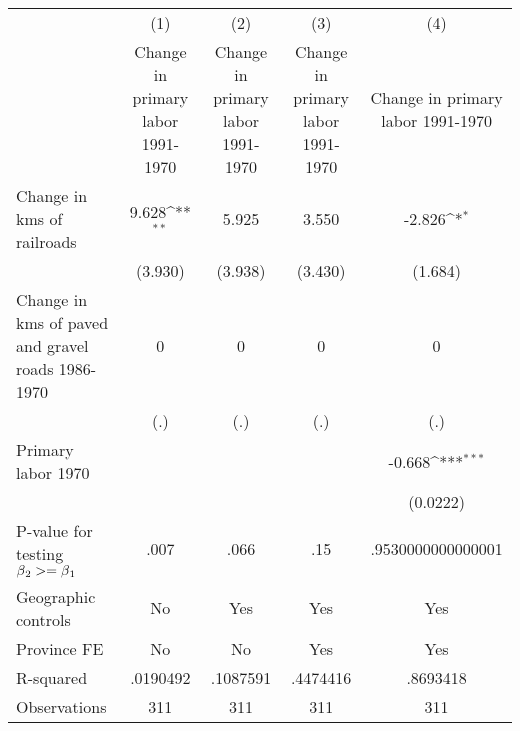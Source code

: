 {
\def\sym#1{\ifmmode^{#1}\else\(^{#1}\)\fi}
\begin{tabular}{l*{4}{c}}
\hline\hline
                &\multicolumn{1}{c}{(1)}&\multicolumn{1}{c}{(2)}&\multicolumn{1}{c}{(3)}&\multicolumn{1}{c}{(4)}\\
                &\multicolumn{1}{c}{Change in primary labor 1991-1970}&\multicolumn{1}{c}{Change in primary labor 1991-1970}&\multicolumn{1}{c}{Change in primary labor 1991-1970}&\multicolumn{1}{c}{Change in primary labor 1991-1970}\\
\hline
Change in kms of railroads&    9.628\sym{**} &    5.925         &    3.550         &   -2.826\sym{*}  \\
                &  (3.930)         &  (3.938)         &  (3.430)         &  (1.684)         \\
[1em]
Change in kms of paved and gravel roads 1986-1970&        0         &        0         &        0         &        0         \\
                &      (.)         &      (.)         &      (.)         &      (.)         \\
[1em]
Primary labor 1970&                  &                  &                  &   -0.668\sym{***}\\
                &                  &                  &                  & (0.0222)         \\
\hline
P-value for testing $\beta\\_2 >= \beta\\_1$&     .007         &     .066         &      .15         &.9530000000000001         \\
Geographic controls&       No         &      Yes         &      Yes         &      Yes         \\
Province FE     &       No         &       No         &      Yes         &      Yes         \\
R-squared       & .0190492         & .1087591         & .4474416         & .8693418         \\
Observations    &      311         &      311         &      311         &      311         \\
\hline\hline
\end{tabular}
}
